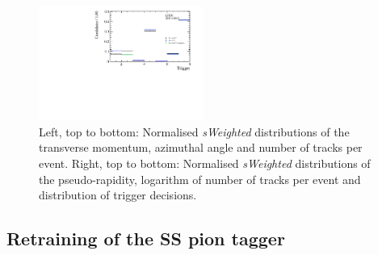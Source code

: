\begin{figure}[tbp]
    \includegraphics[width=0.48\textwidth]{08FlavourTagging/figs/Trigger_weighted.pdf}
    \caption{Left, top to bottom: Normalised \emph{sWeighted} distributions of the transverse momentum, azimuthal angle and number of tracks per event.
    Right, top to bottom: Normalised \emph{sWeighted} distributions of the pseudo-rapidity, logarithm of number of tracks per event and distribution of trigger decisions.}
    \label{fig:reweightingSS}
\end{figure}

\subsection{Retraining of the SS pion tagger}
\label{sec:retrainSSpion}

